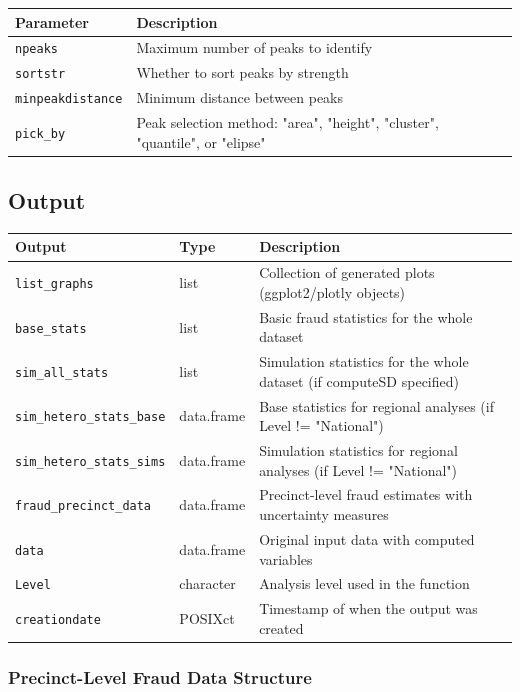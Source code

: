 \documentclass{article}
\begin{document}
\begin{longtable}{p{4cm}p{10cm}}
\toprule
\textbf{Parameter} & \textbf{Description} \\
\midrule
\texttt{npeaks} & Maximum number of peaks to identify \\
\texttt{sortstr} & Whether to sort peaks by strength \\
\texttt{minpeakdistance} & Minimum distance between peaks \\
\texttt{pick\_by} & Peak selection method: "area", "height", "cluster", "quantile", or "elipse" \\
\bottomrule
\end{longtable}

\subsection{Output}
\begin{longtable}{p{4cm}p{3cm}p{7cm}}
\toprule
\textbf{Output} & \textbf{Type} & \textbf{Description} \\
\midrule
\texttt{list\_graphs} & list & Collection of generated plots (ggplot2/plotly objects) \\
\texttt{base\_stats} & list & Basic fraud statistics for the whole dataset \\
\texttt{sim\_all\_stats} & list & Simulation statistics for the whole dataset (if computeSD specified) \\
\texttt{sim\_hetero\_stats\_base} & data.frame & Base statistics for regional analyses (if Level != "National") \\
\texttt{sim\_hetero\_stats\_sims} & data.frame & Simulation statistics for regional analyses (if Level != "National") \\
\texttt{fraud\_precinct\_data} & data.frame & Precinct-level fraud estimates with uncertainty measures \\
\texttt{data} & data.frame & Original input data with computed variables \\
\texttt{Level} & character & Analysis level used in the function \\
\texttt{creationdate} & POSIXct & Timestamp of when the output was created \\
\bottomrule
\end{longtable}

\subsubsection{Precinct-Level Fraud Data Structure}
\end{document}
